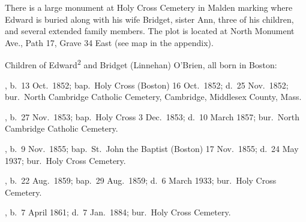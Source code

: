 There is a large monument at Holy Cross Cemetery in Malden marking where Edward is buried along with his wife Bridget, sister Ann, three of his children, and several extended family members. The plot is located at North Monument Ave., Path 17, Grave 34 East (see map in the appendix).\cite{Edward2OBrienGrave,CarolGordon}

\begin{KidsIntro}
	Children of Edward\textsuperscript{2} and Bridget (Linnehan) O'Brien, all born in Boston:
\end{KidsIntro}

\begin{Kids}
	, b.\ 13 Oct.\ 1852;\cite{MaryAnn3OBrienBirth} bap.\ Holy Cross (Boston) 16 Oct.\ 1852;\cite{MaryAnn3OBrienBaptism} d.\ 25 Nov.\ 1852;\cite{MaryAnn3OBrienDeath} bur.\ North Cambridge Catholic Cemetery, Cambridge, Middlesex County, Mass.\cite{DianaBerberenaLetter1}
	
	, b.\ 27 Nov.\ 1853;\cite{Ellen3OBrienBirth} bap.\ Holy Cross 3 Dec.\ 1853;\cite{Ellen3OBrienBaptism} d.\ 10 March 1857;\cite{Ellen3OBrienDeath} bur.\ North Cambridge Catholic Cemetery.\cite{DianaBerberenaLetter2}
	
	, b.\ 9 Nov.\ 1855;\cite{AnnMaria3OBrienBirth} bap.\ St.\ John the Baptist (Boston) 17 Nov.\ 1855\cite{AnnMaria3OBrienBaptism}; d.\ 24 May 1937;\cite{AnnMaria3OBrienDeath} bur.\ Holy Cross Cemetery.\cite{CarolGordon}
	
	, b.\ 22 Aug.\ 1859;\cite{Margaret3OBrienBaptism} bap.\ 29 Aug.\ 1859;\cite{Margaret3OBrienBaptism} d.\ 6 March 1933;\cite{Margaret3OBrienDeath} bur.\ Holy Cross Cemetery.\cite{CarolGordon}
	
	, b.\ 7 April 1861;\cite{Edward3OBrienBirth} d.\ 7 Jan.\ 1884;\cite{Edward3OBrienDeath} bur.\ Holy Cross Cemetery.\cite{CarolGordon}
\end{Kids}